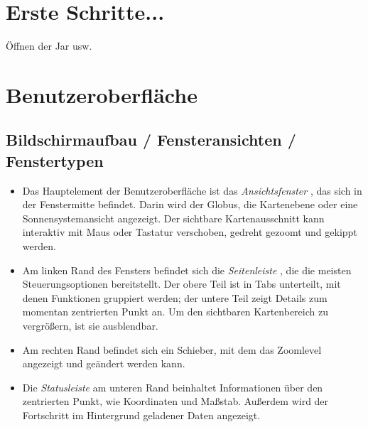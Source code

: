\documentclass[10pt]{scrreprt}
\begin{document}
\chapter{Erste Schritte...}
Öffnen der Jar usw.


\chapter{Benutzeroberfläche}
\section{Bildschirmaufbau / Fensteransichten / Fenstertypen}

\begin{itemize}
	\item Das Hauptelement der Benutzeroberfläche ist das \textit{Ansichtsfenster} , das sich in der Fenstermitte befindet. Darin wird der Globus, die Kartenebene oder eine Sonnensystemansicht angezeigt. Der sichtbare Kartenausschnitt kann interaktiv mit Maus oder Tastatur verschoben, gedreht gezoomt und gekippt werden.
	\item Am linken Rand des Fensters befindet sich die \textit{Seitenleiste} , die die meisten Steuerungsoptionen bereitstellt. Der obere Teil ist in Tabs unterteilt, mit denen Funktionen gruppiert werden; der untere Teil zeigt Details zum momentan zentrierten Punkt an. Um den sichtbaren Kartenbereich zu vergrößern, ist sie ausblendbar.
	\item Am rechten Rand  befindet sich ein Schieber, mit dem das Zoomlevel angezeigt und geändert werden kann.
	\item Die \textit{Statusleiste}  am unteren Rand beinhaltet Informationen über den zentrierten Punkt, wie Koordinaten und Maßstab. Außerdem wird der Fortschritt im Hintergrund geladener Daten angezeigt.
\end{itemize}
\end{document}
